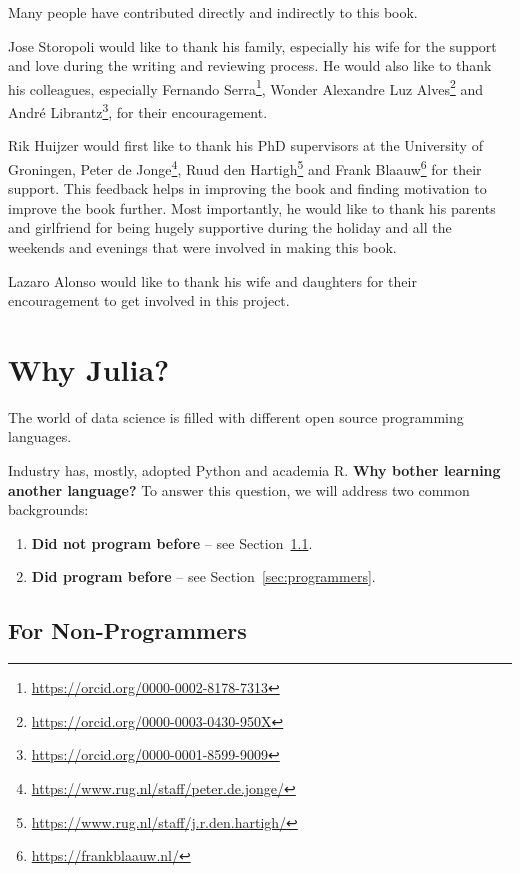 \documentclass[
  notoc %
]{tufte-book}
\DeclareRobustCommand{\href}[2]{#2\footnote{\url{#1}}}
\begin{document}
Many people have contributed directly and indirectly to this book.

Jose Storopoli would like to thank his family, especially his wife for
the support and love during the writing and reviewing process. He would
also like to thank his colleagues, especially
\href{https://orcid.org/0000-0002-8178-7313}{Fernando Serra},
\href{https://orcid.org/0000-0003-0430-950X}{Wonder Alexandre Luz Alves}
and \href{https://orcid.org/0000-0001-8599-9009}{André Librantz}, for
their encouragement.

Rik Huijzer would first like to thank his PhD supervisors at the
University of Groningen,
\href{https://www.rug.nl/staff/peter.de.jonge/}{Peter de Jonge},
\href{https://www.rug.nl/staff/j.r.den.hartigh/}{Ruud den Hartigh} and
\href{https://frankblaauw.nl/}{Frank Blaauw} for their support. This
feedback helps in improving the book and finding motivation to improve
the book further. Most importantly, he would like to thank his parents
and girlfriend for being hugely supportive during the holiday and all
the weekends and evenings that were involved in making this book.

Lazaro Alonso would like to thank his wife and daughters for their
encouragement to get involved in this project.

\hypertarget{sec:why_julia}{%
\chapter{Why Julia?}\label{sec:why_julia}}

The world of data science is filled with different open source
programming languages.

Industry has, mostly, adopted Python and academia R. \textbf{Why bother
learning another language?} To answer this question, we will address two
common backgrounds:

\begin{enumerate}
\def\labelenumi{\arabic{enumi}.}
\item
  \textbf{Did not program before} -- see
  Section~\ref{sec:non-programmers}.
\item
  \textbf{Did program before} -- see Section~\ref{sec:programmers}.
\end{enumerate}

\hypertarget{sec:non-programmers}{%
\section{For Non-Programmers}\label{sec:non-programmers}}
\end{document}
